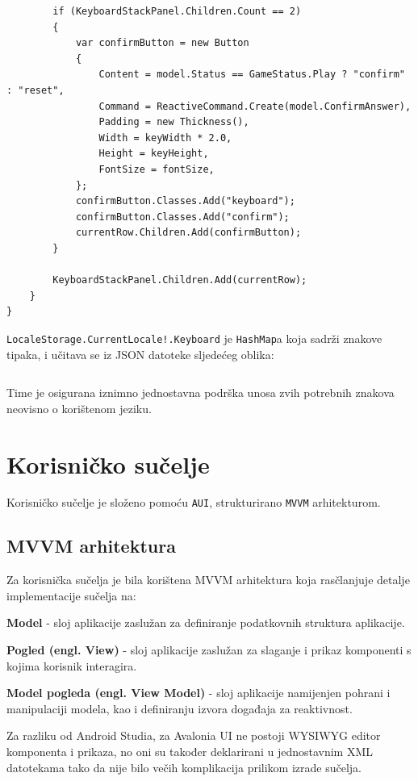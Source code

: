 \documentclass[12pt,a4paper]{report}
\begin{document}
\begin{verbatim}
        if (KeyboardStackPanel.Children.Count == 2)
        {
            var confirmButton = new Button
            {
                Content = model.Status == GameStatus.Play ? "confirm" : "reset",
                Command = ReactiveCommand.Create(model.ConfirmAnswer),
                Padding = new Thickness(),
                Width = keyWidth * 2.0,
                Height = keyHeight,
                FontSize = fontSize,
            };
            confirmButton.Classes.Add("keyboard");
            confirmButton.Classes.Add("confirm");
            currentRow.Children.Add(confirmButton);
        }

        KeyboardStackPanel.Children.Add(currentRow);
    }
}    
\end{verbatim}

\verb|LocaleStorage.CurrentLocale!.Keyboard| je \verb|HashMap|a koja sadrži
znakove tipaka, i učitava se iz JSON datoteke sljedećeg oblika:

\inputminted{json}{../Assets/i18n/keyboard.hr.json}

Time je osigurana iznimno jednostavna podrška unosa zvih potrebnih znakova
neovisno o korištenom jeziku.

\newpage
\section{Korisničko sučelje}

Korisničko sučelje je složeno pomoću \verb|AUI|, strukturirano \verb|MVVM|
arhitekturom.

\subsection{MVVM arhitektura}

Za korisnička sučelja je bila korištena MVVM arhitektura koja rasčlanjuje
detalje implementacije sučelja na:

\textbf{Model} - sloj aplikacije zaslužan za definiranje podatkovnih struktura
aplikacije.

\textbf{Pogled (engl. View)} - sloj aplikacije zaslužan za slaganje i prikaz
komponenti s kojima korisnik interagira.

\textbf{Model pogleda (engl. View Model)} - sloj aplikacije namijenjen pohrani i
manipulaciji modela, kao i definiranju izvora događaja za reaktivnost.

Za razliku od Android Studia, za Avalonia UI ne postoji WYSIWYG editor
komponenta i prikaza, no oni su također deklarirani u jednostavnim XML
datotekama tako da nije bilo večih komplikacija prilikom izrade sučelja.
\end{document}
